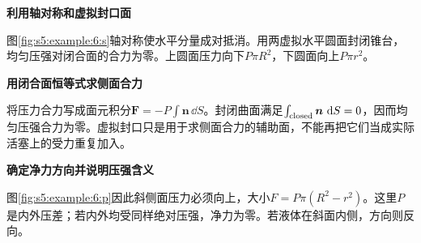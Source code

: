 \begin{solution}\textbf{利用轴对称和虚拟封口面}\par\nobreak
图\ref{fig:s5:example:6:s}轴对称使水平分量成对抵消。用两虚拟水平圆面封闭锥台，均匀压强对闭合面的合力为零。上圆面压力向下$P\pi R^2$，下圆面向上$P\pi r^2$。


\par\medskip{}\noindent\textbf{用闭合面恒等式求侧面合力}\par\nobreak
将压力合力写成面元积分$\boldsymbol F=-P\int\boldsymbol n\,\dd S$。封闭曲面满足$\int_{\rm closed}\boldsymbol n\,\mathop{}\!\mathrm d S=0$，因而均匀压强合力为零。虚拟封口只是用于求侧面合力的辅助面，不能再把它们当成实际活塞上的受力重复加入。



\par\medskip{}\noindent\textbf{确定净力方向并说明压强含义}\par\nobreak
图\ref{fig:s5:example:6:p}因此斜侧面压力必须向上，大小$F=P\pi(R^2-r^2)$。这里$P$是内外压差；若内外均受同样绝对压强，净力为零。若液体在斜面内侧，方向则反向。\end{solution}

